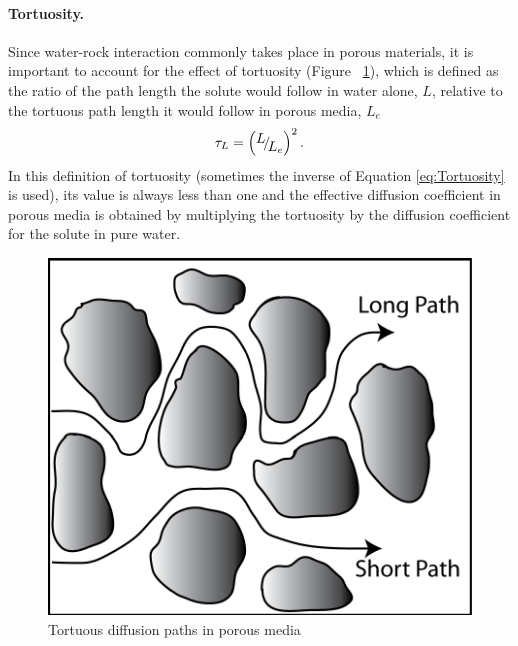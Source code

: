 \paragraph{Tortuosity.}\label{sec:tortuosity}
Since water-rock interaction commonly takes place in porous materials, 
it is important to account for the effect of tortuosity (Figure ~\ref{fig:Tortuosity}), 
which is defined as the ratio of the path length the solute would follow in water alone, $L$, 
relative to the tortuous path length it would follow in porous media, $L_e$ \citep{bear-1972}
\begin{equation} \label{eq:Tortuosity} 
  \tau_{L} 
  =
  \left({\raise0.7ex\hbox{$ L $}\!\mathord{\left/ {\vphantom {L L_{e} }} \right. 
  \kern-\nulldelimiterspace}\!\lower0.7ex\hbox{$ L_{e}  $}} \right)^{2}.  
\end{equation} 
In this definition of tortuosity (sometimes the inverse of Equation \eqref{eq:Tortuosity} is used), 
its value is always less than one and the effective diffusion coefficient in porous media 
is obtained by multiplying the tortuosity by the diffusion coefficient for the solute in pure water. 
\begin{figure}
\begin{center}
  \includegraphics[scale=0.5]{figs/Figure4-Steefel.pdf}
  \caption{Tortuous diffusion paths in porous media \citep{steefel2009fluid}}
  \label{fig:Tortuosity}
\end{center}
\end{figure}

